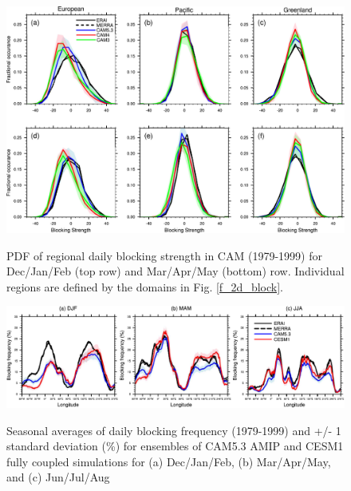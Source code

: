 \documentclass[12pt,varwidth]{article}
\begin{document}
\begin{figure}[t]
  \begin{center}
    \noindent\includegraphics[width=1.0\textwidth,angle=0.]{./figs/f_block_pdf.pdf}\\
  \end{center}
  \caption{PDF of regional daily blocking strength in CAM (1979-1999) for Dec/Jan/Feb (top row) and Mar/Apr/May (bottom) row. Individual regions are defined by the domains in Fig. \ref{f_2d_block}.}
\label{f_block_pdf}
\end{figure}

\pagebreak



\begin{figure}[t]
  \begin{center}
    \noindent\includegraphics[width=1.0\textwidth,angle=0.]{./figs/f_bfreq_cesm1.pdf}\\
  \end{center}
  \caption{Seasonal averages of daily blocking frequency (1979-1999) and +/- 1 standard deviation (\%) for ensembles of CAM5.3 AMIP and CESM1 fully coupled simulations for (a) Dec/Jan/Feb, (b) Mar/Apr/May, and (c) Jun/Jul/Aug } 
\label{f_bfreq_cesm1}
\end{figure}
\end{document}
